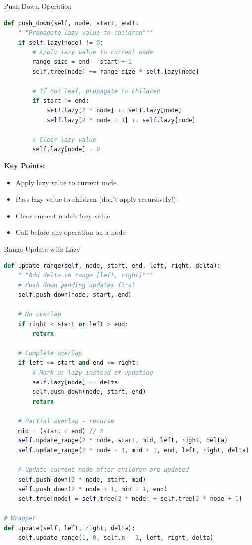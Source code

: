 \documentclass[aspectratio=169]{beamer}
\begin{document}
\begin{frame}[fragile]{Push Down Operation}
  \begin{lstlisting}[language=Python, basicstyle=\ttfamily\footnotesize]
def push_down(self, node, start, end):
    """Propagate lazy value to children"""
    if self.lazy[node] != 0:
        # Apply lazy value to current node
        range_size = end - start + 1
        self.tree[node] += range_size * self.lazy[node]

        # If not leaf, propagate to children
        if start != end:
            self.lazy[2 * node] += self.lazy[node]
            self.lazy[2 * node + 1] += self.lazy[node]

        # Clear lazy value
        self.lazy[node] = 0
  \end{lstlisting}

  \vspace{0.3cm}
  \textbf{Key Points:}
  \begin{itemize}
    \item Apply lazy value to current node
    \item Pass lazy value to children (don't apply recursively!)
    \item Clear current node's lazy value
    \item Call before any operation on a node
  \end{itemize}
\end{frame}

\begin{frame}[fragile]{Range Update with Lazy}
  \begin{lstlisting}[language=Python, basicstyle=\ttfamily\tiny]
def update_range(self, node, start, end, left, right, delta):
    """Add delta to range [left, right]"""
    # Push down pending updates first
    self.push_down(node, start, end)

    # No overlap
    if right < start or left > end:
        return

    # Complete overlap
    if left <= start and end <= right:
        # Mark as lazy instead of updating
        self.lazy[node] += delta
        self.push_down(node, start, end)
        return

    # Partial overlap - recurse
    mid = (start + end) // 2
    self.update_range(2 * node, start, mid, left, right, delta)
    self.update_range(2 * node + 1, mid + 1, end, left, right, delta)

    # Update current node after children are updated
    self.push_down(2 * node, start, mid)
    self.push_down(2 * node + 1, mid + 1, end)
    self.tree[node] = self.tree[2 * node] + self.tree[2 * node + 1]

# Wrapper
def update(self, left, right, delta):
    self.update_range(1, 0, self.n - 1, left, right, delta)
  \end{lstlisting}
\end{frame}
\end{document}
